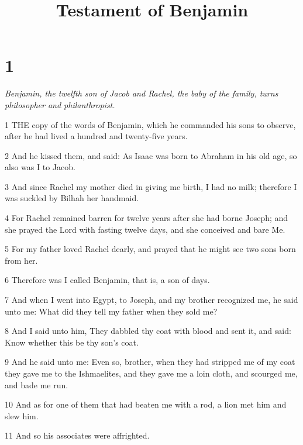 

\title{Testament of Benjamin}

\chapter{1}

\par \textit{Benjamin, the twelfth son of Jacob and Rachel, the baby of the family, turns philosopher and philanthropist.}

\par 1 THE copy of the words of Benjamin, which he commanded his sons to observe, after he had lived a hundred and twenty-five years.

\par 2 And he kissed them, and said: As Isaac was born to Abraham in his old age, so also was I to Jacob.

\par 3 And since Rachel my mother died in giving me birth, I had no milk; therefore I was suckled by Bilhah her handmaid.

\par 4 For Rachel remained barren for twelve years after she had borne Joseph; and she prayed the Lord with fasting twelve days, and she conceived and bare Me.

\par 5 For my father loved Rachel dearly, and prayed that he might see two sons born from her.

\par 6 Therefore was I called Benjamin, that is, a son of days.

\par 7 And when I went into Egypt, to Joseph, and my brother recognized me, he said unto me: What did they tell my father when they sold me?

\par 8 And I said unto him, They dabbled thy coat with blood and sent it, and said: Know whether this be thy son's coat.

\par 9 And he said unto me: Even so, brother, when they had stripped me of my coat they gave me to the Ishmaelites, and they gave me a loin cloth, and scourged me, and bade me run.

\par 10 And as for one of them that had beaten me with a rod, a lion met him and slew him.

\par 11 And so his associates were affrighted.

